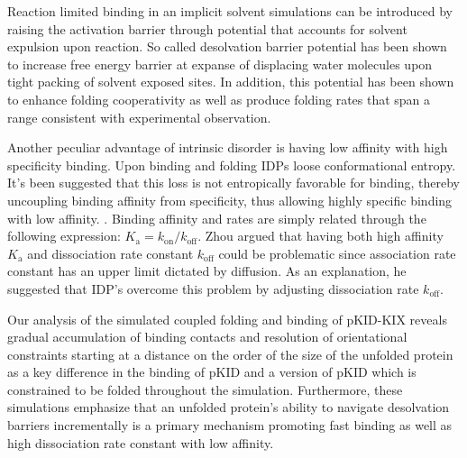 \documentclass[../talant.diss.submit.tex]{subfiles}
\begin{document}
Reaction limited binding in an implicit solvent simulations can be introduced by raising the activation barrier through
potential that accounts for solvent expulsion upon reaction. So called desolvation barrier potential %
has been shown to increase free energy barrier at expanse of displacing water molecules upon tight packing of solvent
exposed sites.\cite{levy:06,cheung:02,liu:05}
In addition, this potential has been shown to enhance folding cooperativity \cite{chan:11,liu:05a} as well as produce
folding rates that span a range consistent with experimental observation.\cite{ferguson:09}


Another peculiar advantage of intrinsic disorder is having low affinity with high specificity
binding.\cite{uversky:05} Upon binding and folding IDPs loose conformational entropy. 
It's been suggested that this loss is not entropically favorable for binding, thereby uncoupling
binding affinity from specificity, thus allowing highly specific binding with low affinity.
\cite{dyson:05,zhou:12}. Binding affinity and rates are simply related through the following
expression: $K_{\mathrm{a}} = k_{\mathrm{on}}/k_{\mathrm{off}}$. Zhou argued that
having both high affinity $K_{\mathrm{a}}$ and dissociation rate constant $k_{\mathrm{off}}$ could
be problematic since association rate constant has an upper limit dictated by diffusion.\cite{zhou:12}
As an explanation, he suggested that IDP's overcome this problem by adjusting dissociation rate
$k_{\mathrm{off}}$.

Our analysis of the simulated coupled folding and binding of pKID-KIX reveals
gradual accumulation of binding contacts and resolution of orientational constraints
starting at a distance on the order of the size of the unfolded protein as a key difference
in the binding of pKID and a version of pKID which is constrained to be folded throughout
the simulation. Furthermore, these simulations emphasize that an unfolded protein's ability
to navigate desolvation barriers incrementally is a primary mechanism promoting fast binding
as well as high dissociation rate constant with low affinity. 
\end{document}
